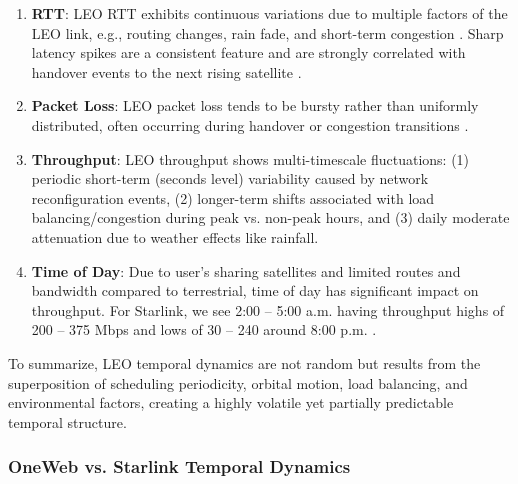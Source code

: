 \documentclass[12pt]{article}
\begin{document}
\begin{enumerate}
    \item \textbf{RTT}: LEO RTT exhibits continuous variations due to multiple factors of the LEO link, e.g., routing changes, rain fade, and short-term congestion \cite{chen2025minimum}. Sharp latency spikes are a consistent feature and are strongly correlated with handover events to the next rising satellite \cite{tian2025attention}.
    \item \textbf{Packet Loss}: LEO packet loss tends to be bursty rather than uniformly distributed, often occurring during handover or congestion transitions \cite{li2024satguard}.
    \item \textbf{Throughput}: LEO throughput shows multi-timescale fluctuations: (1) periodic short-term (seconds level) variability caused by network reconfiguration events, (2) longer-term shifts associated with load balancing/congestion during peak vs. non-peak hours, and (3) daily moderate attenuation due to weather effects like rainfall.
    \item \textbf{Time of Day}: Due to user's sharing satellites and limited routes and bandwidth compared to terrestrial, time of day has significant impact on throughput. For Starlink, we see 2:00 -- 5:00 a.m. having throughput highs of 200 -- 375 Mbps and lows of 30 -- 240 around 8:00 p.m. \cite{liu2025vivisecting}.
\end{enumerate}

To summarize, LEO temporal dynamics are not random but results from the superposition of scheduling periodicity, orbital motion, load balancing, and environmental factors, creating a highly volatile yet partially predictable temporal structure.

\subsubsection{OneWeb vs. Starlink Temporal Dynamics}
\end{document}
